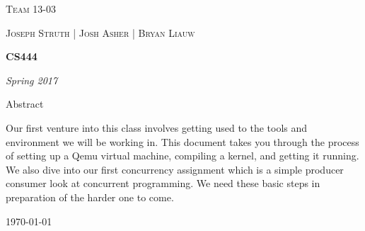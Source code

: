 \documentclass[10pt,draftclsnofoot,onecolumn, compsoc]{IEEEtran}
\begin{document}
\begin{titlepage}
	\centering
	{\scshape\LARGE Team 13-03 \par}
	\vspace{1cm}
	{\scshape\Large Joseph Struth  |  Josh Asher  |   Bryan Liauw\par}
	\vspace{1.5cm}
	{\huge\bfseries CS444\par}
	\vspace{2cm}
	{\Large\itshape Spring 2017\par}
	\vspace{4cm}
	{\large Abstract\par}
	\vspace{1cm}
	Our first venture into this class involves getting used to the tools and environment we will be working in.
	This document takes you through the process of setting up a Qemu virtual machine, compiling a kernel, and
	getting it running. We also dive into our first concurrency assignment which is a simple producer consumer
	look at concurrent programming. We need these basic steps in preparation of the harder one to come.
	\vfill

	{\large \today\par}
\end{titlepage}
\end{document}
